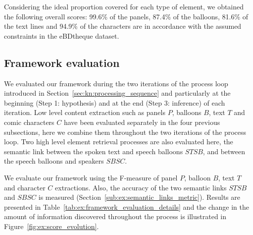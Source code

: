 Considering the ideal proportion covered for each type of element, we obtained the following overall scores: 99.6\% of the panels, 87.4\% of the balloons, 81.6\% of the text lines and 94.9\% of the characters are in accordance with the assumed constraints in the eBDtheque dataset.
%

\subsection{Framework evaluation}
We evaluated our framework during the two iterations of the process loop introduced in Section~\ref{sec:kn:processing_sequence} and particularly at the beginning (Step 1: hypothesis) and at the end (Step 3: inference) of each iteration.
Low level content extraction such as panels $P$, balloons $B$, text $T$ and comic characters $C$ have been evaluated separately in the four previous subsections, here we combine them throughout the two iterations of the process loop.
Two high level element retrieval processes are also evaluated here, the semantic link between the spoken text and speech balloons $STSB$, and between the speech balloons and speakers $SBSC$.

We evaluate our framework using the F-measure of panel $P$, balloon $B$, text $T$ and character $C$ extractions.
Also, the accuracy of the two semantic links $STSB$ and $SBSC$ is measured (Section~\ref{sub:ex:semantic_links_metric}).
Results are presented in Table~\ref{tab:ex:framework_evaluation_details} and the change in the amount of information discovered throughout the process is illustrated in Figure~\ref{fig:ex:score_evolution}.


